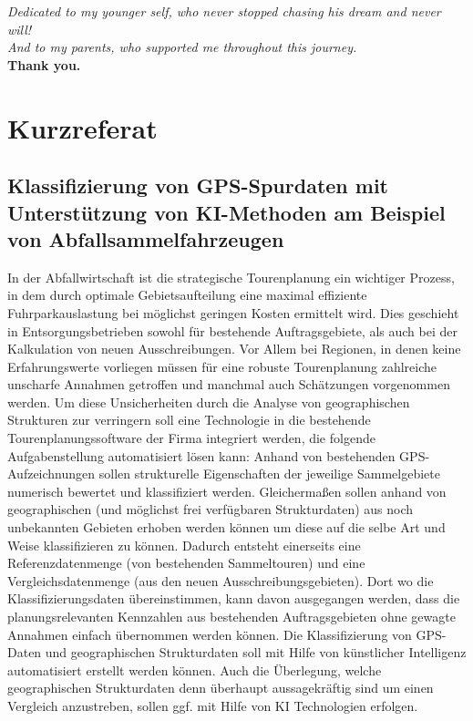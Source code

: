 \documentclass[a4paper,12pt,twoside]{scrreprt}
\begin{document}
\vspace{1cm} 
\begin{center}
    \emph{Dedicated to my younger self, who never stopped chasing his dream and never will!}\\[0.5cm]
    \emph{And to my parents, who supported me throughout this journey.}\\[0.5cm]
    \textbf{Thank you.}
\end{center}
\vspace{1cm}

\newpage
\section*{Kurzreferat}

\subsection*{Klassifizierung von GPS-Spurdaten mit Unterstützung von KI-Methoden am Beispiel von Abfallsammelfahrzeugen}

In der Abfallwirtschaft ist die strategische Tourenplanung ein wichtiger Prozess, in dem durch optimale Gebietsaufteilung eine maximal effiziente Fuhrparkauslastung bei möglichst geringen Kosten ermittelt wird. Dies geschieht in Entsorgungsbetrieben sowohl für bestehende Auftragsgebiete, als auch bei der Kalkulation von neuen Ausschreibungen. Vor Allem bei Regionen, in denen keine Erfahrungswerte vorliegen müssen für eine robuste Tourenplanung zahlreiche unscharfe Annahmen getroffen und manchmal auch Schätzungen vorgenommen werden. Um diese Unsicherheiten durch die Analyse von geographischen Strukturen zur verringern soll eine Technologie in die bestehende Tourenplanungssoftware der Firma integriert werden, die folgende Aufgabenstellung automatisiert lösen kann: Anhand von bestehenden GPS-Aufzeichnungen sollen strukturelle Eigenschaften der jeweilige Sammelgebiete numerisch bewertet und klassifiziert werden. Gleichermaßen sollen anhand von geographischen (und möglichst frei verfügbaren Strukturdaten) aus noch unbekannten Gebieten erhoben werden können um diese auf die selbe Art und Weise klassifizieren zu können. Dadurch entsteht einerseits eine Referenzdatenmenge (von bestehenden Sammeltouren) und eine Vergleichsdatenmenge (aus den neuen Ausschreibungsgebieten). Dort wo die Klassifizierungsdaten übereinstimmen, kann davon ausgegangen werden, dass die planungsrelevanten Kennzahlen aus bestehenden Auftragsgebieten ohne gewagte Annahmen einfach übernommen werden können. Die Klassifizierung von GPS-Daten und geographischen Strukturdaten soll mit Hilfe von künstlicher Intelligenz automatisiert erstellt werden können. Auch die Überlegung, welche geographischen Strukturdaten denn überhaupt aussagekräftig sind um einen Vergleich anzustreben, sollen ggf. mit Hilfe von KI Technologien erfolgen. 
\end{document}
